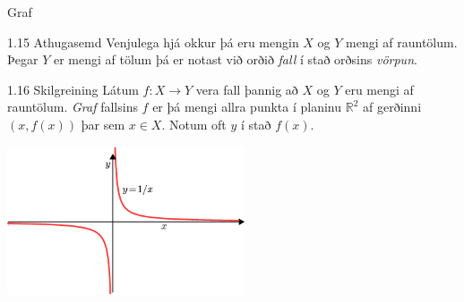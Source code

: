 \documentclass[icelandic,a4paper,12pt]{article}
\newcommand{\R}{{\mathbb  R}}
\begin{document}
\begin{frame}{Graf}
\begin{block}{1.15 Athugasemd}
 Venjulega hjá okkur þá eru mengin $X$ og $Y$ mengi af rauntölum. Þegar $Y$ er
mengi af tölum þá er notast við orðið \emph{fall} í stað orðsins 
\emph{vörpun}.
\end{block}

\pause

\begin{block}{1.16 Skilgreining}
Látum $f:X \to Y$ vera fall þannig að $X$ og $Y$ eru mengi 
af rauntölum. \emph{Graf} fallsins $f$ er þá mengi allra punkta í planinu
$\R^2$ af gerðinni $(x,f(x))$ þar sem $x\in X$. 
Notum oft $y$ í stað $f(x)$.
\end{block}

\begin{center}
\includegraphics[width=7cm,keepaspectratio=true]{./myndir/kafli01/02_Graf.png}
\end{center}

\end{frame}
\end{document}
